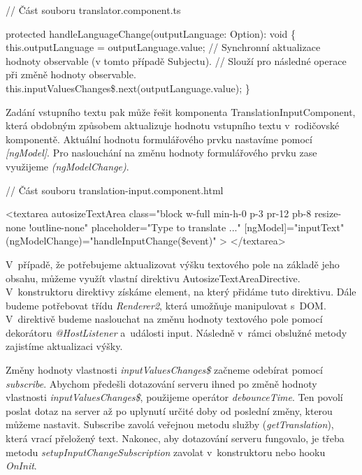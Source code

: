 \begin{prog}
// Část souboru translator.component.ts

protected handleLanguageChange(outputLanguage: Option): void \{
  this.outputLanguage = outputLanguage.value;
  // Synchronní aktualizace hodnoty observable (v tomto případě Subjectu).
  // Slouží pro následné operace při změně hodnoty observable.
  this.inputValuesChanges\$.next(outputLanguage.value);
\}
\end{prog}

Zadání vstupního textu pak může řešit komponenta TranslationInputComponent, která obdobným způsobem aktualizuje hodnotu vstupního textu v~rodičovské komponentě. 
Aktuální hodnotu formulářového prvku nastavíme pomocí \emph{[ngModel]}. Pro naslouchání na změnu hodnoty formulářového prvku zase využijeme \emph{(ngModelChange)}.

\begin{prog}
// Část souboru translation-input.component.html

<textarea
  autosizeTextArea
  class="block w-full min-h-0 p-3 pr-12 pb-8 resize-none !outline-none"
  placeholder="Type to translate ..."
  [ngModel]="inputText"
  (ngModelChange)="handleInputChange(\$event)"
>
</textarea>
\end{prog}

V~případě, že potřebujeme aktualizovat výšku textového pole na základě jeho obsahu, můžeme využít vlastní direktivu AutosizeTextAreaDirective. 
V~konstruktoru direktivy získáme element, na který přidáme tuto direktivu. Dále budeme potřebovat třídu \emph{Renderer2}, která umožňuje manipulovat s~DOM. 
V~direktivě budeme naslouchat na změnu hodnoty textového pole pomocí dekorátoru \emph{@HostListener} a~události input. Následně v~rámci obslužné metody zajistíme aktualizaci výšky.

Změny hodnoty vlastnosti \emph{inputValuesChanges\$} začneme odebírat pomocí \emph{subscribe}. 
Abychom předešli dotazování serveru ihned po změně hodnoty vlastnosti \emph{inputValuesChanges\$}, použijeme operátor \emph{debounceTime}. 
Ten povolí poslat dotaz na server až po uplynutí určité doby od poslední změny, kterou můžeme nastavit. 
Subscribe zavolá veřejnou metodu služby (\emph{getTranslation}), která vrací přeložený text. 
Nakonec, aby dotazování serveru fungovalo, je třeba metodu \emph{setupInputChangeSubscription} zavolat v~konstruktoru nebo hooku \emph{OnInit}.

